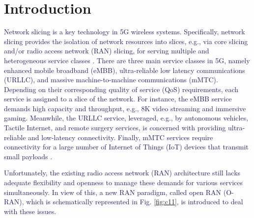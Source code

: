 \documentclass[lettersize,journal]{IEEEtran}
\begin{document}
\section{Introduction}
\textcolor{MidnightBlue}{Network slicing is a key technology in 5G wireless systems. Specifically, network slicing provides the isolation of network resources into slices, e.g., via core slicing and/or radio access network (RAN) slicing, for serving multiple and heterogeneous service classes \cite{shen2020ai,setayesh2020joint,popovski20185g}. There are three main service classes in 5G, namely enhanced mobile broadband (eMBB), ultra-reliable low latency communications (URLLC), and massive machine-to-machine communications (mMTC). Depending on their corresponding quality of service (QoS) requirements, each service is assigned to a slice of the network.
For instance, the eMBB service demands high capacity and throughput,  e.g., 8K video streaming and immersive gaming. Meanwhile, the URLLC service, leveraged, e.g., by autonomous vehicles, Tactile Internet, and remote surgery services, is concerned with providing ultra-reliable and low-latency connectivity. Finally, mMTC services require connectivity for a large number of Internet of Things (IoT) devices that transmit small payloads \cite{dogra2020survey,alsenwi2021intelligent,SL}.}

\textcolor{MidnightBlue}{Unfortunately, the existing radio access network (RAN) architecture still lacks adequate flexibility and openness to manage these demands for various services simultaneously. In view of this, a new RAN paradigm, called open RAN (O-RAN), which is schematically represented in Fig. \ref{fig:c11}, is introduced to deal with these issues.}
\end{document}
